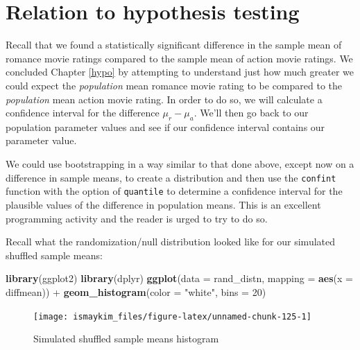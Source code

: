 \documentclass[]{tufte-book}
\newenvironment{Shaded}{\begin{snugshade}}{\end{snugshade}}
\newcommand{\KeywordTok}[1]{\textcolor[rgb]{0.13,0.29,0.53}{\textbf{{#1}}}}
\newcommand{\DataTypeTok}[1]{\textcolor[rgb]{0.13,0.29,0.53}{{#1}}}
\newcommand{\DecValTok}[1]{\textcolor[rgb]{0.00,0.00,0.81}{{#1}}}
\newcommand{\StringTok}[1]{\textcolor[rgb]{0.31,0.60,0.02}{{#1}}}
\newcommand{\NormalTok}[1]{{#1}}
\theoremstyle{definition}
\theoremstyle{definition}
\theoremstyle{remark}
\begin{document}
\section{Relation to hypothesis
testing}\label{relation-to-hypothesis-testing}

Recall that we found a statistically significant difference in the
sample mean of romance movie ratings compared to the sample mean of
action movie ratings. We concluded Chapter \ref{hypo} by attempting to
understand just how much greater we could expect the \emph{population}
mean romance movie rating to be compared to the \emph{population} mean
action movie rating. In order to do so, we will calculate a confidence
interval for the difference \(\mu_r - \mu_a\). We'll then go back to our
population parameter values and see if our confidence interval contains
our parameter value.

We could use bootstrapping in a way similar to that done above, except
now on a difference in sample means, to create a distribution and then
use the \texttt{confint} function with the option of \texttt{quantile}
to determine a confidence interval for the plausible values of the
difference in population means. This is an excellent programming
activity and the reader is urged to try to do so.

Recall what the randomization/null distribution looked like for our
simulated shuffled sample means:

\begin{Shaded}
\begin{Highlighting}[]
\KeywordTok{library}\NormalTok{(ggplot2)}
\KeywordTok{library}\NormalTok{(dplyr)}
\KeywordTok{ggplot}\NormalTok{(}\DataTypeTok{data =} \NormalTok{rand_distn, }\DataTypeTok{mapping =} \KeywordTok{aes}\NormalTok{(}\DataTypeTok{x =} \NormalTok{diffmean)) +}
\StringTok{  }\KeywordTok{geom_histogram}\NormalTok{(}\DataTypeTok{color =} \StringTok{"white"}\NormalTok{, }\DataTypeTok{bins =} \DecValTok{20}\NormalTok{)}
\end{Highlighting}
\end{Shaded}

\begin{figure}

{\centering \texttt{[image: ismaykim\_files/figure-latex/unnamed-chunk-125-1]} 

}

\caption[Simulated shuffled sample means histogram]{Simulated shuffled sample means histogram}\label{fig:unnamed-chunk-125}
\end{figure}
\end{document}
